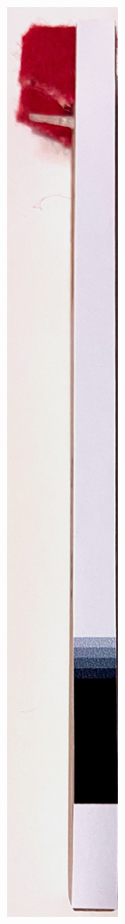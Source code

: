 \begin{figure}  
  \centering
  \includegraphics[angle=90,width=\linewidth]{src/images/jack-w-tag.jpeg} 
  \caption{} 
  \Description{} 
  \label{fig:jack-w-tag}
\end{figure}

